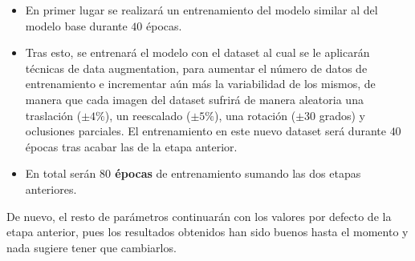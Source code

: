             \begin{itemize}
                \item En primer lugar se realizará un entrenamiento del modelo similar al del modelo base durante $40$ épocas.
                \item Tras esto, se entrenará el modelo con el dataset al cual se le aplicarán técnicas de data augmentation, para aumentar el número de datos de entrenamiento e incrementar aún más la variabilidad de los mismos, de manera que cada imagen del dataset sufrirá de manera aleatoria una traslación ($\pm 4\%$), un reescalado ($\pm 5\%$), una rotación ($\pm 30$ grados) y oclusiones parciales. El entrenamiento en este nuevo dataset será durante $40$ épocas tras acabar las de la etapa anterior. 
                \item En total serán \textbf{$80$ épocas} de entrenamiento sumando las dos etapas anteriores.
            \end{itemize}

            \medskip

            \noindent De nuevo, el resto de parámetros continuarán con los valores por defecto de la etapa anterior, pues los resultados obtenidos han sido buenos hasta el momento y nada sugiere tener que cambiarlos.

